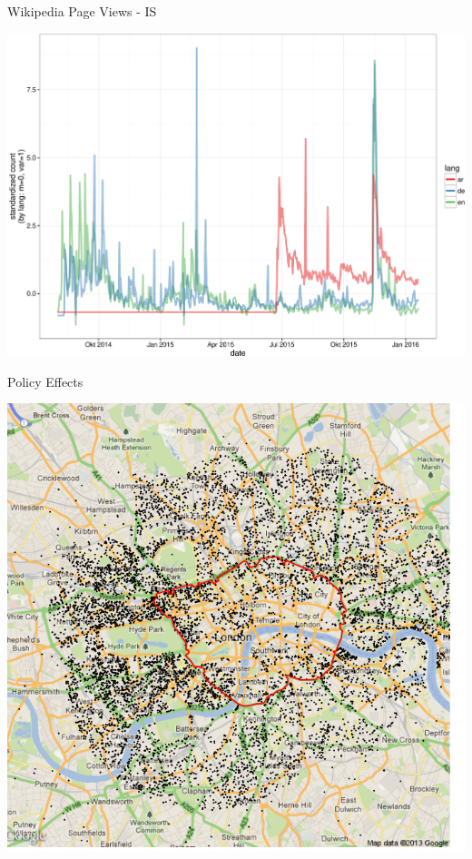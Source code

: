 \documentclass[ignorenonframetext,]{beamer}
\begin{document}
\begin{frame}{Wikipedia Page Views - IS}

\includegraphics{fig/isis-1.pdf}

\end{frame}

\begin{frame}{Policy Effects}

\includegraphics{fig/policyeffects.png}

\end{frame}
\end{document}
